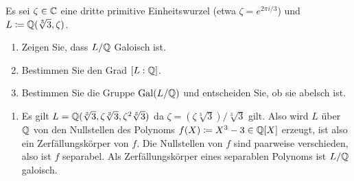 \begin{question}[subtitle = {Galoisgruppe von $\Rational(\sqrt[3]{3}, \zeta)/\Rational$}]
  Es sei $\zeta \in \mathbb{C}$ eine dritte primitive Einheitswurzel (etwa $\zeta = e^{2 \pi i/3}$) und $L \coloneqq \mathbb{Q}(\sqrt[3]{3}, \zeta)$.
  \begin{enumerate}
    \item
      Zeigen Sie, dass $L/\mathbb{Q}$ Galoisch ist.
    \item
      Bestimmen Sie den Grad $[L : \mathbb{Q}]$.
    \item
      Bestimmen Sie die Gruppe $\operatorname{Gal}(L/\mathbb{Q})$ und entscheiden Sie, ob sie abelsch ist.
  \end{enumerate}
\end{question}


\begin{solution}
  \begin{enumerate}
    \item
      Es gilt $L = \mathbb{Q}(\sqrt[3]{3}, \zeta \sqrt[3]{3}, \zeta^2 \sqrt[3]{3})$ da $\zeta = (\zeta \sqrt[3]{3}) / \sqrt[3]{3}$ gilt.
      Also wird $L$ über $\mathbb{Q}$ von den Nullstellen des Polynoms $f(X) \coloneqq X^3 - 3 \in \mathbb{Q}[X]$ erzeugt, ist also ein Zerfällungskörper von $f$.
      Die Nullstellen von $f$ sind paarweise verschieden, also ist $f$ separabel.
      Als Zerfällungskörper eines separablen Polynoms ist $L/\mathbb{Q}$ galoisch.
      

\end{enumerate}
\end{solution}
